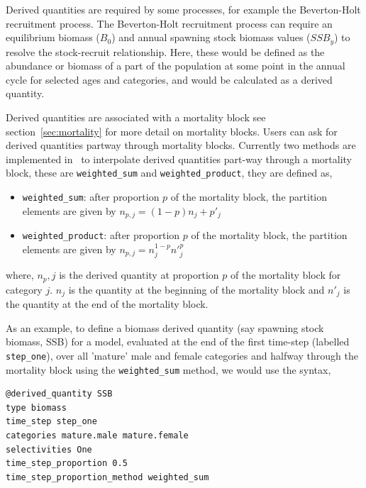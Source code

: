 Derived quantities are required by some processes, for example the Beverton-Holt recruitment process. The Beverton-Holt recruitment process can require an equilibrium biomass ($B_0$) and annual spawning stock biomass values ($SSB_y$) to resolve the stock-recruit relationship. Here, these would be defined as the abundance or biomass of a part of the population at some point in the annual cycle for selected ages and categories, and would be calculated as a derived quantity.

Derived quantities are associated with a mortality block see section~\ref{sec:mortality} for more detail on mortality blocks. Users can ask for derived quantities partway through mortality blocks. Currently two methods are implemented in \CNAME\ to interpolate derived quantities part-way through a mortality block, these are \texttt{weighted\_sum} and \texttt{weighted\_product}, they are defined as,
\begin{itemize}
	\item \texttt{weighted\_sum}: after proportion $p$ of the mortality block, the partition elements are given by $n_{p,j} = (1 - p)n_j + p'_j$
	
	\item \texttt{weighted\_product}: after proportion $p$ of the mortality block, the partition elements are given by $n_{p,j} = n_j^{1-p} n'^p_j$
\end{itemize}
where, $n_p,j$ is the derived quantity at proportion $p$ of the mortality block for category $j$. $n_j$ is the quantity at the beginning of the mortality block and $n'_j$ is the quantity at the end of the mortality block.


As an example, to define a biomass derived quantity (say spawning stock biomass, SSB) for a model, evaluated at the end of the first time-step (labelled \texttt{step\_one}), over all 'mature' male and female categories and halfway through the mortality block using the \texttt{weighted\_sum} method, we would use the syntax,

{\small{\begin{verbatim}
@derived_quantity SSB
type biomass
time_step step_one
categories mature.male mature.female
selectivities One
time_step_proportion 0.5
time_step_proportion_method weighted_sum
\end{verbatim}}}

\subsection{\label{sec:age-at-age}}

